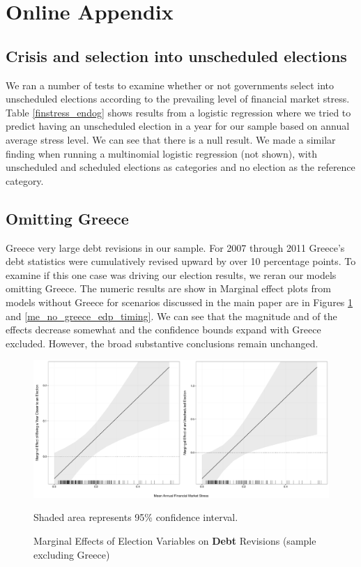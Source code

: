 \documentclass[]{article}
\begin{document}
\section*{Online Appendix}

\subsection*{Crisis and selection into unscheduled elections}

We ran a number of tests to examine whether or not governments select into unscheduled elections according to the prevailing level of financial market stress. Table \ref{finstress_endog} shows results from a logistic regression where we tried to predict having an unscheduled election in a year for our sample based on annual average stress level. We can see that there is a null result. We made a similar finding when running a multinomial logistic regression (not shown), with unscheduled and scheduled elections as categories and no election as the reference category.



\subsection*{Omitting Greece}

Greece very large debt revisions in our sample. For 2007 through 2011 Greece's debt statistics were cumulatively revised upward by over 10 percentage points. To examine if this one case was driving our election results, we reran our models omitting Greece. The numeric results are show in Marginal effect plots from models without Greece for scenarios discussed in the main paper are in Figures \ref{me_no_greece} and \ref{me_no_greece_edp_timing}. We can see that the magnitude and of the effects decrease somewhat and the confidence bounds expand with Greece excluded. However, the broad substantive conclusions remain unchanged.

\begin{figure}[H]
    \caption{Marginal Effects of Election Variables on \textbf{Debt} Revisions (sample excluding Greece)}
    \label{me_no_greece}

    \begin{center}
        \includegraphics[scale=0.4]{figures/debt_me_nogreece.pdf}
    \end{center}

	{\scriptsize{Shaded area represents 95\% confidence interval.}}

\end{figure}
\end{document}
